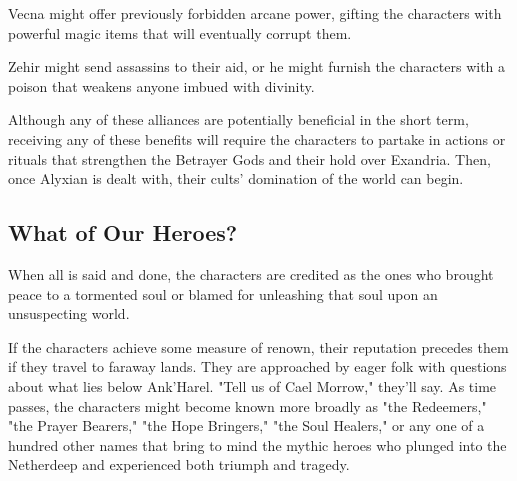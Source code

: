 \documentclass[10pt,a4paper,twoside,bg=print,twocolumn,openany,nodeprecatedcode]{dndbook}
\begin{document}
Vecna might offer previously forbidden arcane power, gifting the characters with powerful magic items that will eventually corrupt them.

Zehir might send assassins to their aid, or he might furnish the characters with a poison that weakens anyone imbued with divinity.

Although any of these alliances are potentially beneficial in the short term, receiving any of these benefits will require the characters to partake in actions or rituals that strengthen the Betrayer Gods and their hold over Exandria. Then, once Alyxian is dealt with, their cults' domination of the world can begin.

\subsection{What of Our Heroes?}
When all is said and done, the characters are credited as the ones who brought peace to a tormented soul or blamed for unleashing that soul upon an unsuspecting world.

If the characters achieve some measure of renown, their reputation precedes them if they travel to faraway lands. They are approached by eager folk with questions about what lies below Ank'Harel. "Tell us of Cael Morrow," they'll say. As time passes, the characters might become known more broadly as "the Redeemers," "the Prayer Bearers," "the Hope Bringers," "the Soul Healers," or any one of a hundred other names that bring to mind the mythic heroes who plunged into the Netherdeep and experienced both triumph and tragedy.
\end{document}
